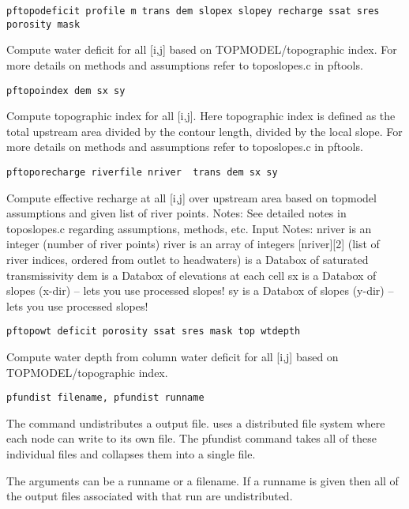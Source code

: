 \begin{description}
\item{\begin{verbatim}pftopodeficit profile m trans dem slopex slopey recharge ssat sres porosity mask\end{verbatim}}
Compute water deficit for all [i,j] based on TOPMODEL/topographic index. For more details on methods and assumptions 
refer to toposlopes.c in pftools.

\item{\begin{verbatim}pftopoindex dem sx sy\end{verbatim}}
Compute topographic index for all [i,j].  Here topographic index is defined as the total upstream area divided by the contour
length, divided by the local slope. For more details on methods and assumptions refer to toposlopes.c in pftools.


\item{\begin{verbatim}pftoporecharge riverfile nriver  trans dem sx sy\end{verbatim}}
Compute effective recharge at all [i,j] over upstream area based on topmodel assumptions and given list of river points.
Notes:  See detailed notes in toposlopes.c regarding assumptions, methods, etc. Input Notes: nriver is an integer (number
of river points) river  is an array of integers [nriver][2] (list of river indices, ordered from outlet to headwaters) is
a Databox of saturated transmissivity dem    is a Databox of elevations at each cell sx is a Databox of slopes (x-dir) -- 
lets you use processed slopes! sy is a Databox of slopes (y-dir) -- lets you use processed slopes!

\item{\begin{verbatim}pftopowt deficit porosity ssat sres mask top wtdepth\end{verbatim}}
Compute water depth from column water deficit for all [i,j] based on TOPMODEL/topographic index.

\item{\begin{verbatim}pfundist filename, pfundist runname\end{verbatim}}
The command undistributes a \parflow{} output file.  \parflow{} uses a
distributed file system where each node can write to its own file.
The pfundist command takes all of these individual files and collapses
them into a single file.

The arguments can be a runname or a filename.  If a runname is given
then all of the output files associated with that run are
undistributed.


\end{description}
